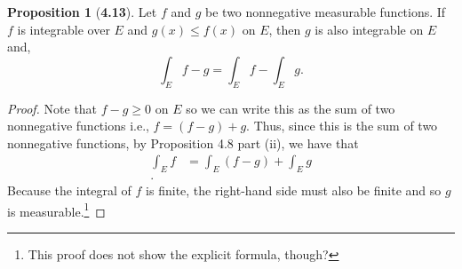 \documentclass[12pt]{article}
\theoremstyle{definition}
\newtheorem*{prop}{Proposition}
\begin{document}
\begin{prop}[\textbf{4.13}]

  Let \( f \) and \( g \) be two nonnegative measurable functions. 
  If \( f \) is integrable over \( E \) and \( g(x) \leq f(x) \) on \( E \), then \( g \) is also integrable on \( E \) and, 
    \[
        \int_{E} f - g = \int_{E} f - \int_{E} g.
    \]

    \begin{proof}
      Note that \( f - g \geq 0 \) on \( E \) so we can write this as the sum of two nonnegative functions i.e., \( f = (f - g) + g \).  Thus, since this is the sum of two nonnegative functions, by Proposition 4.8 part (ii), we have that 
        \begin{align*}
          \int_{E} f &= \int_{E} (f - g) + \int_{E} g \\.
        \end{align*}
      Because the integral of \( f \) is finite, the right-hand side must also be finite and so \( g \) is measurable.\footnote{This proof does not show the explicit formula, though?}
    \end{proof}
\end{prop}
\end{document}
